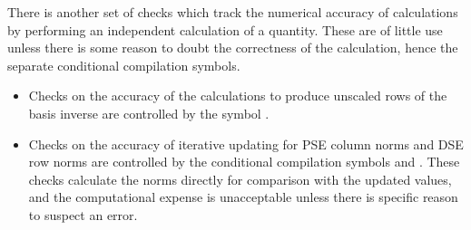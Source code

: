 There is another set of checks which track the numerical accuracy of
calculations by performing an independent calculation of a quantity.
These are of little use unless there is some reason to doubt the correctness
of the calculation, hence the separate conditional compilation symbols.
\begin{itemize}
  \item
  Checks on the accuracy of the calculations to produce unscaled rows of the
  basis inverse are controlled by the symbol .

  \item
  Checks on the accuracy of iterative updating for PSE column norms and
  DSE row norms are controlled by the conditional compilation symbols
   and .
  These checks calculate the norms directly for comparison with
  the updated values, and the computational expense is
  unacceptable unless there is specific reason to suspect an error.
\end{itemize}

